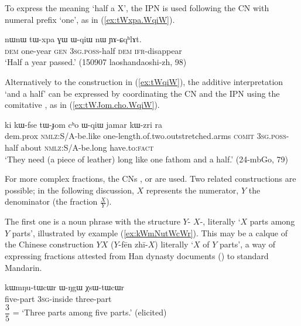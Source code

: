 To express the meaning `half a X', the IPN  is used following the CN with numeral prefix `one', as in (\ref{ex:tWxpa.WqiW}).

\begin{exe}
\ex \label{ex:tWxpa.WqiW}
\gll nɯnɯ tɯ-xpa ɣɯ ɯ-qiɯ nɯ ɲɤ-ɕqʰlɤt. \\
\textsc{dem} one-year \textsc{gen} \textsc{3sg}.\textsc{poss}-half \textsc{dem} \textsc{ifr}-disappear \\
\glt  `Half a year passed.' (150907 laoshandaoshi-zh, 98)
\end{exe}

Alternatively to the construction in (\ref{ex:tWqiW}), the additive interpretation  `and a half' can be expressed by coordinating the CN and the IPN  using the comitative , as in (\ref{ex:tWJom.cho.WqiW}).

\begin{exe}
\ex \label{ex:tWJom.cho.WqiW}
\gll ki kɯ-fse tɯ-ɟom cʰo ɯ-qiɯ jamar kɯ-zri ra \\
 dem.prox \textsc{nmlz}:S/A-be.like one-length.of.two.outstretched.arms \textsc{comit} \textsc{3sg}.\textsc{poss}-half about \textsc{nmlz}:S/A-be.long have.to:\textsc{fact} \\
\glt `They need (a piece of leather) long like one fathom and a half.' (24-mbGo, 79)
\end{exe}

For more complex fractions, the CNs ,  or  are used. Two related constructions are possible; in the following discussion, $X$ represents the numerator, $Y$ the denominator (the fraction $\frac{X}{Y}$). 

The first one is a noun phrase with the structure $Y$-  $X$-, literally `$X$ parts among $Y$ parts', illustrated by example (\ref{ex:kWmNutWcWr}). This may be a calque of the Chinese construction $Y$$X$ 
($Y$-fēn zhī-$X$) literally `$X$ of $Y$ parts', a way of expressing fractions attested from Han dynasty documents (\citealt{anicotte15fractions}) to standard Mandarin.
 
\begin{exe}
\ex \label{ex:kWmNutWcWr}
\gll kɯmŋu-tɯcɯr ɯ-ŋgɯ χsɯ-tɯcɯr  \\
 five-part \textsc{3sg}-inside three-part \\
\glt $\dfrac{3}{5}$ = `Three parts among five parts.' (elicited)
\end{exe}


